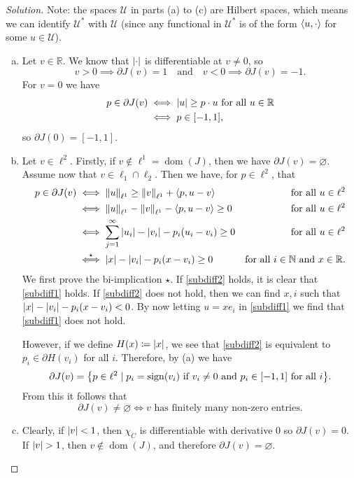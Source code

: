 \documentclass{article}
\theoremstyle{plain}
\theoremstyle{remark}
\newenvironment{solution}{\begin{proof}[Solution]\renewcommand\qedsymbol{}}{\end{proof}}
\renewcommand{\emptyset}{\varnothing}
\newcommand{\Bb}{\mathbb}
\newcommand{\Cal}{\mathcal}
\newcommand{\NN}{\Bb N}
\newcommand{\RR}{\Bb R}
\newcommand\UU{\Cal U}
\DeclarePairedDelimiter{\ang}{\langle}{\rangle}
\newcommand\ceq\coloneqq %
\DeclareMathOperator{\sign}{sign}
\newcommand\pt\partial
\DeclareMathOperator\dom{dom}
\begin{document}
\begin{solution}
	Note: the spaces $\UU$ in parts (a) to (c) are Hilbert spaces, which means we can identify $\UU^*$ with $\UU$ (since any functional in $\UU^*$ is of the form $\ang{u, \cdot}$ for some $u \in \UU$). 
\begin{enumerate}[(a)]
\item Let $v \in \RR$. We know that $\abs{\cdot}$ is differentiable at $v \neq 0$, so 
\[
v > 0 \implies \pt J(v) = \qty{1} \quad\text{and}\quad v < 0 \implies \pt J(v) = \qty{-1}. 
\]
For $v = 0$ we have
\begin{align*}
	p \in \pt J(v) &\iff \abs{u} \geq p \cdot u  \text{ for all $u \in \RR$} \\
	&\iff p \in [-1, 1],
\end{align*}
so $\pt J(0) = [-1, 1]$. 

\item Let $v \in \ell^2$. Firstly, if $v \notin \ell^1 = \dom(J)$, then we have $\pt J(v) = \emptyset$. Assume now that $v \in \ell_1 \cap \ell_2$. Then we have, for $p \in \ell^2$, that
\begin{align}
	p \in \pt J(v) &\iff \norm{u}_{\ell^1} \geq \norm{v}_{\ell^1} + \ang{p, u - v} &\text{for all $u \in \ell^2$}  \nonumber \\
	&\iff \norm{u}_{\ell^1} - \norm{v}_{\ell^1} - \ang{p, u- v} \geq 0 &\text{for all $u \in \ell^2$} \nonumber \\
	&\iff \sum_{j=1}^\infty \abs{u_i} - \abs{v_i} - p_i(u_i - v_i) \geq 0 &\text{for all $u \in \ell^2$} \label{subdiff1} \\
	&\overset\star\iff \abs{x} - \abs{v_i} - p_i(x - v_i) \geq 0 &\text{for all $i \in \NN$ and $x \in \RR$}. \label{subdiff2}  
\end{align}
We first prove the bi-implication $\star$. If \eqref{subdiff2} holds, it is clear that \eqref{subdiff1} holds. If \eqref{subdiff2} does not hold, then we can find $x, i$ such that $\abs{x} - \abs{v_i} - p_i(x - v_i) < 0$. By now letting $u = x e_i$ in \eqref{subdiff1} we find  that \eqref{subdiff1} does not hold. 

However, if we define $H(x) \ceq \abs{x}$,  we see that \cref{subdiff2} is equivalent to $p_i \in \pt H(v_i)$ for all $i$. Therefore, by (a) we have
\[
\pt J(v) = \qty{p \in \ell^2 \mid p_i = \sign(v_i) \text{ if $v_i \neq 0$ and } p_i \in [-1, 1] \text{ for all $i$}}. 
\]
From this it follows that
\[
\pt J(v) \neq \emptyset \iff v \text{ has finitely many non-zero entries.}
\]

\item Clearly, if $\abs{v} < 1$, then $\chi_C$ is differentiable with derivative 0 so $\pt J(v) = \qty{0}$. If $\abs{v} > 1$, then $v \notin \dom(J)$, and therefore $\pt J(v) = \emptyset$. 


\end{enumerate}
\end{solution}
\end{document}
